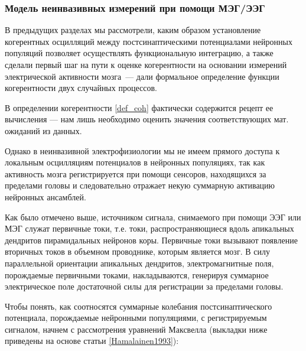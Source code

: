

\subsubsection{Модель неинвазивных измерений при помощи МЭГ/ЭЭГ}
В предыдущих разделах мы рассмотрели, каким образом установление когерентных
осцилляций между постсинаптическими потенциалами нейронных популяций позволяет
осуществлять функциональную интеграцию, а также сделали первый шаг на пути к оценке когерентности
на основании измерений электрической активности мозга~--- дали формальное определение функции когерентности
двух случайных процессов.

В определении когерентности \ref{def_coh} фактически содержится рецепт ее вычисления --- нам лишь
необходимо оценить значения соответствующих мат. ожиданий из данных.

Однако в неинвазивной электрофизиологии мы не имеем прямого доступа к локальным осцилляциям потенциалов
в нейронных популяциях, так как активность мозга регистрируется при помощи сенсоров, находящихся за пределами
головы и следовательно отражает некую суммарную активацию нейронных ансамблей.

Как было отмечено выше, источником сигнала, снимаемого при помощи ЭЭГ или МЭГ служат
первичные токи, т.е. токи, распространяющиеся вдоль апикальных дендритов пирамидальных нейронов коры.
Первичные токи вызывают появление вторичных токов в объемном проводнике, которым является мозг.
В силу параллельной ориентации апикальных дендритов, электромагнитные поля, порождаемые
первичными токами, накладываются, генерируя суммарное электрическое поле достаточной силы для
регистрации за пределами головы.

Чтобы понять, как соотносятся суммарные колебания постсинаптического потенциала,
порождаемые нейронными популяциями, с регистрируемым сигналом,
начнем с рассмотрения уравнений Максвелла (выкладки ниже приведены на основе статьи \ref{Hamalainen1993}):

